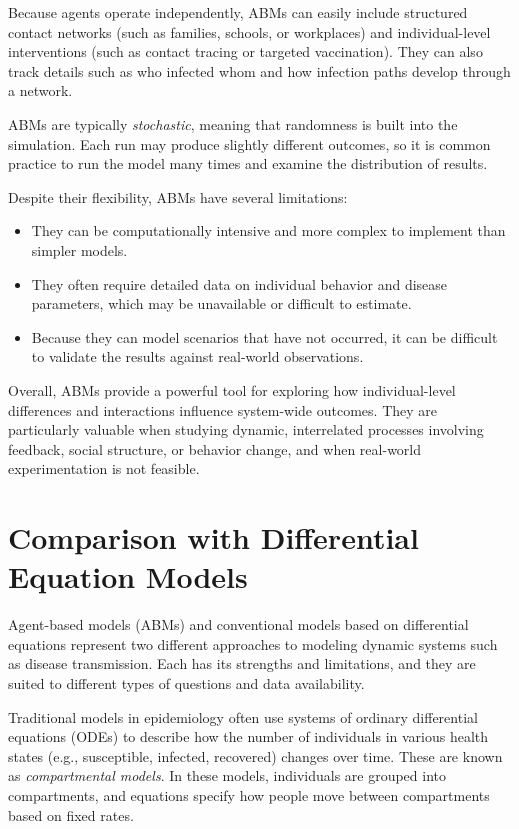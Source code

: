 \documentclass{article}
\begin{document}
Because agents operate independently, ABMs can easily include structured contact networks (such as families, schools, or workplaces) and individual-level interventions (such as contact tracing or targeted vaccination). They can also track details such as who infected whom and how infection paths develop through a network.

ABMs are typically \emph{stochastic}, meaning that randomness is built into the simulation. Each run may produce slightly different outcomes, so it is common practice to run the model many times and examine the distribution of results.

Despite their flexibility, ABMs have several limitations:
\begin{itemize}
    \item They can be computationally intensive and more complex to implement than simpler models.
    \item They often require detailed data on individual behavior and disease parameters, which may be unavailable or difficult to estimate.
    \item Because they can model scenarios that have not occurred, it can be difficult to validate the results against real-world observations.
\end{itemize}

Overall, ABMs provide a powerful tool for exploring how individual-level differences and interactions influence system-wide outcomes. They are particularly valuable when studying dynamic, interrelated processes involving feedback, social structure, or behavior change, and when real-world experimentation is not feasible.

\section{Comparison with Differential Equation Models}

Agent-based models (ABMs) and conventional models based on differential equations represent two different approaches to modeling dynamic systems such as disease transmission. Each has its strengths and limitations, and they are suited to different types of questions and data availability.

Traditional models in epidemiology often use systems of ordinary differential equations (ODEs) to describe how the number of individuals in various health states (e.g., susceptible, infected, recovered) changes over time. These are known as \emph{compartmental models}. In these models, individuals are grouped into compartments, and equations specify how people move between compartments based on fixed rates.
\end{document}
